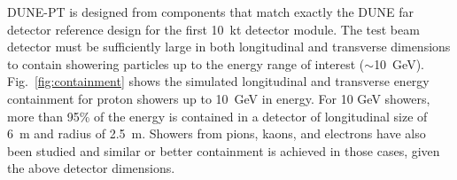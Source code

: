 

DUNE-PT is designed from components that match exactly the DUNE far detector reference design for the first 10~kt detector module.
The test beam detector must be sufficiently large in both
longitudinal and transverse dimensions to contain showering particles up to the energy range of interest ($\sim$10~GeV).
Fig.~\ref{fig:containment} shows the simulated longitudinal and transverse 
energy containment for proton showers up to 10~GeV in energy.
For 10 GeV showers, more than 95\% of the energy is contained in a detector of longitudinal size of 6~m and 
radius of 2.5~m. Showers from pions, kaons, and electrons have also been studied and similar or better containment is achieved in those cases, given the above detector dimensions.
